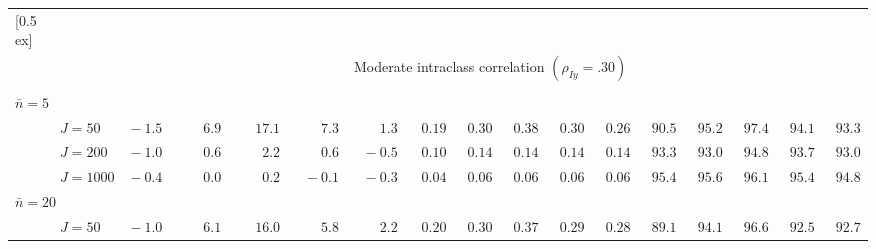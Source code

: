 \begin{sidewaystable}
\begin{threeparttable}
\begin{tabular}{llccccccccccccccc}
[0.5ex]\hline\\[-1.6ex] 
& & \multicolumn{15}{c}{Moderate intraclass correlation $(\rho_{Iy}=.30)$} \\[0.6ex]\hline\\[-1.8ex]
\multicolumn{4}{l}{$\bar{n}=5$} \\  & \nopagebreak $\;J=50$  & $\phantom{0}{-}1.5\phantom{0}$ & $\phantom{0}\phantom{-}6.9\phantom{0}$ & $\phantom{-}17.1\phantom{0}$ & $\phantom{0}\phantom{-}7.3\phantom{0}$ & $\phantom{0}\phantom{-}1.3\phantom{0}$ & $\phantom{0}0.19\phantom{0}$ & $\phantom{0}0.30\phantom{0}$ & $\phantom{0}0.38\phantom{0}$ & $\phantom{0}0.30\phantom{0}$ & $\phantom{0}0.26\phantom{0}$ & $\phantom{0}90.5\phantom{0}$ & $\phantom{0}95.2\phantom{0}$ & $\phantom{0}97.4\phantom{0}$ & $\phantom{0}94.1\phantom{0}$ & $\phantom{0}93.3\phantom{0}$ \\
 & \nopagebreak $\;J=200$  & $\phantom{0}{-}1.0\phantom{0}$ & $\phantom{0}\phantom{-}0.6\phantom{0}$ & $\phantom{0}\phantom{-}2.2\phantom{0}$ & $\phantom{0}\phantom{-}0.6\phantom{0}$ & $\phantom{0}{-}0.5\phantom{0}$ & $\phantom{0}0.10\phantom{0}$ & $\phantom{0}0.14\phantom{0}$ & $\phantom{0}0.14\phantom{0}$ & $\phantom{0}0.14\phantom{0}$ & $\phantom{0}0.14\phantom{0}$ & $\phantom{0}93.3\phantom{0}$ & $\phantom{0}93.0\phantom{0}$ & $\phantom{0}94.8\phantom{0}$ & $\phantom{0}93.7\phantom{0}$ & $\phantom{0}93.0\phantom{0}$ \\
 & \nopagebreak $\;J=1000$  & $\phantom{0}{-}0.4\phantom{0}$ & $\phantom{0}\phantom{-}0.0\phantom{0}$ & $\phantom{0}\phantom{-}0.2\phantom{0}$ & $\phantom{0}{-}0.1\phantom{0}$ & $\phantom{0}{-}0.3\phantom{0}$ & $\phantom{0}0.04\phantom{0}$ & $\phantom{0}0.06\phantom{0}$ & $\phantom{0}0.06\phantom{0}$ & $\phantom{0}0.06\phantom{0}$ & $\phantom{0}0.06\phantom{0}$ & $\phantom{0}95.4\phantom{0}$ & $\phantom{0}95.6\phantom{0}$ & $\phantom{0}96.1\phantom{0}$ & $\phantom{0}95.4\phantom{0}$ & $\phantom{0}94.8\phantom{0}$ \\
\multicolumn{4}{l}{$\bar{n}=20$} \\  & \nopagebreak $\;J=50$  & $\phantom{0}{-}1.0\phantom{0}$ & $\phantom{0}\phantom{-}6.1\phantom{0}$ & $\phantom{-}16.0\phantom{0}$ & $\phantom{0}\phantom{-}5.8\phantom{0}$ & $\phantom{0}\phantom{-}2.2\phantom{0}$ & $\phantom{0}0.20\phantom{0}$ & $\phantom{0}0.30\phantom{0}$ & $\phantom{0}0.37\phantom{0}$ & $\phantom{0}0.29\phantom{0}$ & $\phantom{0}0.28\phantom{0}$ & $\phantom{0}89.1\phantom{0}$ & $\phantom{0}94.1\phantom{0}$ & $\phantom{0}96.6\phantom{0}$ & $\phantom{0}92.5\phantom{0}$ & $\phantom{0}92.7\phantom{0}$ \\

\end{tabular}
\end{threeparttable}
\end{sidewaystable}
